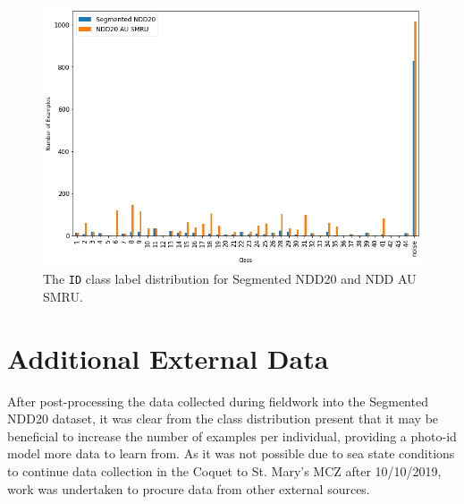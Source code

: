 \begin{figure}
	\begin{center}
		\includegraphics[scale=0.5]{Chapter4/figs/seg-ndd20-and-ndd20-au-smru-dist}
	\end{center}
	\caption{The \texttt{ID} class label distribution for Segmented NDD20 and NDD AU SMRU.}
	\label{fig:segmented-ndd20-and-ndd20-au-smru-dist}
\end{figure}

\section{Additional External Data}\label{ch:NDD,sec:NDD_AU_SMRU}

After post-processing the data collected during fieldwork into the Segmented NDD20 dataset, it was clear from the class distribution present that it may be beneficial to increase the number of examples per individual, providing a photo-id model more data to learn from. As it was not possible due to sea state conditions to continue data collection in the Coquet to St. Mary's MCZ after 10/10/2019, work was undertaken to procure data from other external sources. 

